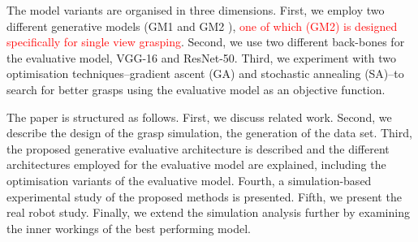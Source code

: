 The model variants are organised in three dimensions. First, we employ two different generative models (GM1 \cite{kopicki2015ijrr} and GM2 \cite{kopicki2019ijrr}), \textcolor{red}{one of which (GM2) is designed specifically for single view grasping}. Second, we use two different back-bones for the evaluative model, VGG-16 and ResNet-50. Third, we experiment with two optimisation techniques--gradient ascent (GA) and stochastic annealing (SA)--to search for better grasps using the evaluative model as an objective function.



The paper is structured as follows. First, we discuss related work. Second, we describe the design of the grasp simulation, the generation of the data set. Third, the proposed generative evaluative architecture is described and the different architectures employed for the evaluative model are explained, including the optimisation variants of the evaluative model. Fourth, a simulation-based experimental study of the proposed methods is presented. Fifth, we present the real robot study. Finally, we extend the simulation analysis further by examining the inner workings of the best performing model. 
